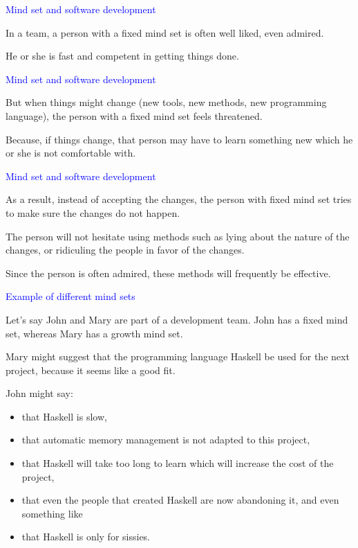 \documentclass{slides}
\newcommand{\ti}[1]{\begin{center}\Large{\textcolor{blue}{#1}}\end{center}}
\begin{document}
\begin{slide}\ti{Mind set and software development}

In a team, a person with a fixed mind set is often well liked,
even admired.

He or she is fast and competent in getting things done.

\vfill\end{slide}
\begin{slide}\ti{Mind set and software development}

But when things might change (new tools, new methods, new programming
language), the person with a fixed mind set feels threatened.

Because, if things change, that person may have to learn something new
which he or she is not comfortable with.

\vfill\end{slide}
\begin{slide}\ti{Mind set and software development}

As a result, instead of accepting the changes, the person with fixed
mind set tries to make sure the changes do not happen.

The person will not hesitate using methods such as lying about the
nature of the changes, or ridiculing the people in favor of the
changes.

Since the person is often admired, these methods will frequently be
effective.

\vfill\end{slide}
\begin{slide}\ti{Example of different mind sets}

Let's say John and Mary are part of a development team.  John has a
fixed mind set, whereas Mary has a growth mind set.

Mary might suggest that the programming language Haskell be used for
the next project, because it seems like a good fit.

John might say:
\begin{itemize}
\item that Haskell is slow,
\item that automatic memory management is not adapted to this project,
\item that Haskell will take too long to learn which will increase the
  cost of the project,
\item that even the people that created Haskell are now abandoning it,
  and even something like
\item that Haskell is only for sissies.
\end{itemize}

\vfill\end{slide}
\end{document}
